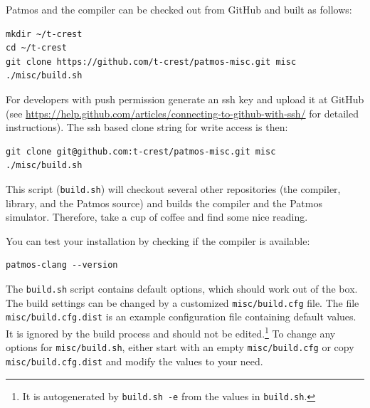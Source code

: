\documentclass[a4paper,fontsize=10pt,twoside,DIV15,BCOR12mm,headinclude=true,footinclude=false,pagesize,bibtotoc]{scrbook}
\newcommand{\code}[1]{{\texttt{#1}}}
\newcommand{\comment}[3]{

\textsf{\textbf{#1}} {\color{#3}#2}}
\newcommand{\martin}[1]{\comment{Martin}{#1}{Blue}}
\newcommand{\stefan}[1]{\comment{Stefan}{#1}{RoyalPurple}}
\renewcommand{\martin}[1]{}
\renewcommand{\stefan}[1]{}
\begin{document}
Patmos and the compiler can be checked out from GitHub and built as follows:

\begin{verbatim}
mkdir ~/t-crest
cd ~/t-crest
git clone https://github.com/t-crest/patmos-misc.git misc
./misc/build.sh
\end{verbatim}


For developers with push permission generate an ssh key and upload
it at GitHub (see \url{https://help.github.com/articles/connecting-to-github-with-ssh/}
for detailed instructions).
The ssh based clone string for write access is then:

\begin{verbatim}
git clone git@github.com:t-crest/patmos-misc.git misc
./misc/build.sh
\end{verbatim}

This script (\code{build.sh}) will checkout several other repositories (the compiler, library,
and the Patmos source) and
builds the compiler and the Patmos simulator.
Therefore, take a cup of coffee and find some nice reading.

You can test your installation by checking if the compiler is available:

\begin{verbatim}
patmos-clang --version
\end{verbatim}

The \code{build.sh} script contains default options, which should work out of the box. 
The build settings can be changed by a customized \code{misc/build.cfg} file. The file \code{misc/build.cfg.dist}
is an example configuration file containing default values. It is ignored by the build process and should not be
edited.\footnote{It is autogenerated by \code{build.sh -e} from the values in \code{build.sh}.}
To change any options for \code{misc/build.sh}, either start with an empty \code{misc/build.cfg} or
copy \code{misc/build.cfg.dist} and modify the values to your need.


\martin{In Mac OS X I have only .profile and I don't understand what the issue by 'only read by login terminals'.}
\stefan{Login shells are only opened at logins. Interactive terminals are all terminals that are opened by your window manager or
other means. This is why you need to reboot to have .profile take effect. There are slight differences between bash and zsh when which file is read, 
and distribution further mix up the files in non-standard ways.}

\stefan{Relative paths should actually work, but the \textasciitilde{} shortcut is shell-specific and may not work, but
not sure about this.}
\end{document}
